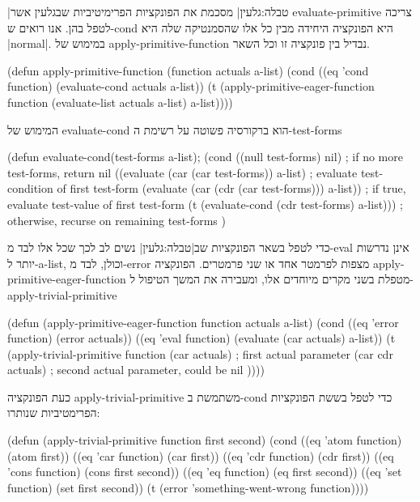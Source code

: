 \documentclass[a4paper,12pt,reqno]{article}
\begin{document}
|טבלה:גלעין| מסכמת את הפונקציות הפרימיטיביות שבגלעין אשר evaluate-primitive צריכה לטפל בהן. 
אנו רואים ש-cond היא הפונקציה היחידה מבין כל אלו שהסמנטיקה שלה היא \E|normal|.
במימוש של apply-primitive-function נבדיל בין פונקציה זו וכל השאר.  
\begin{LISP}
(defun apply-primitive-function (function actuals a-list)
  (cond
    ((eq 'cond function)  
      (evaluate-cond actuals a-list))
    (t 
      (apply-primitive-eager-function 
        function 
        (evaluate-list actuals a-list) 
        a-list))))
\end{LISP}
המימוש של evaluate-cond הוא ברקורסיה פשוטה על רשימת ה-test-forms
\begin{LISP}
(defun evaluate-cond(test-forms a-list);
  (cond
    ((null test-forms) nil) ; if no more test-forms, return nil
    ((evaluate (car (car test-forms)) a-list) ; evaluate test-condition of first test-form 
      (evaluate (car (cdr (car test-forms))) a-list)) ; if true, evaluate test-value of first test-form
    (t (evaluate-cond (cdr test-forms) a-list))) ; otherwise, recurse on remaining test-forms
)
\end{LISP}
כדי לטפל בשאר הפונקציות שב|טבלה:גלעין| נשים לב לכך שכל אלו לבד מ-eval אינן נדרשות יותר ל-a-list, וכולן, לבד מ-error
מצפות לפרמטר אחד או שני פרמטרים. הפונקציה 
apply-primitive-eager-function מטפלת בשני מקרים מיוחדים אלו, ומעבירה את המשך הטיפול ל-apply-trivial-primitive
\begin{LISP}
(defun (apply-primitive-eager-function function actuals a-list)
  (cond
    ((eq 'error function) (error actuals))
    ((eq 'eval function) (evaluate (car actuals) a-list))
    (t (apply-trivial-primitive 
      function
      (car actuals)     ; first actual parameter
      (car cdr actuals) ; second actual parameter, could be nil
))))
\end{LISP}
כעת הפונקציה apply-trivial-primitive משתמשת ב-cond כדי לטפל בששת הפונקציות הפרימטיביות שנותרו: 
\begin{LISP}
(defun (apply-trivial-primitive function first second)
  (cond
    ((eq 'atom function) (atom first))
    ((eq 'car function)  (car first))
    ((eq 'cdr function)  (cdr first))
    ((eq 'cons function) (cons first second))
    ((eq 'eq function)   (eq first second))
    ((eq 'set function)  (set first second))
    (t (error 'something-went-wrong function))))
\end{LISP}
\end{document}
